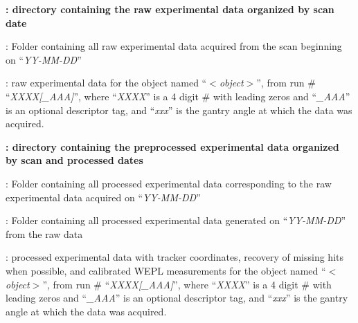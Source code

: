 \documentclass[landscape,12pt]{article}
\begin{document}
 \color{Black}\textbf{: directory containing the raw experimental data organized by scan date}
\begin{myEnumerate}[labelindent=1pt, leftmargin=*]
    \item {} \color{Black}: Folder containing all raw experimental data acquired from the scan beginning on ``\textit{YY-MM-DD}''
    \begin{myEnumerate}[labelindent=1pt, leftmargin=*]
        \item {} \color{Black}: raw experimental data for the object named ``\textit{$<$object$>$}'', from run \# ``\textit{XXXX[\_AAA]}'', where ``\textit{XXXX}'' is a 4 digit \# with leading zeros and ``\textit{\_AAA}'' is an optional descriptor tag, and ``\textit{xxx}'' is the gantry angle at which the data was acquired.
    \end{myEnumerate}
\end{myEnumerate}
\baylorsection
 \color{Black}\textbf{: directory containing the preprocessed experimental data organized by scan and processed dates}
\begin{myEnumerate}[labelindent=1pt, leftmargin=*]
    \item {} \color{Black}: Folder containing all processed experimental data corresponding to the raw experimental data acquired on ``\textit{YY-MM-DD}''
    \begin{myEnumerate}[labelindent=1pt, leftmargin=*]
        \item {} \color{Black}: Folder containing all processed experimental data generated on ``\textit{YY-MM-DD}'' from the raw data
        \begin{myEnumerate}[labelindent=1pt, leftmargin=*]
            \item {} \color{Black}: processed experimental data with tracker coordinates, recovery of missing hits when possible, and calibrated WEPL measurements for the object named ``\textit{$<$object$>$}'', from run \# ``\textit{XXXX[\_AAA]}'', where ``\textit{XXXX}'' is a 4 digit \# with leading zeros and ``\textit{\_AAA}'' is an optional descriptor tag, and ``\textit{xxx}'' is the gantry angle at which the data was acquired.
        \end{myEnumerate}
    \end{myEnumerate}
\end{myEnumerate}
\end{document}
